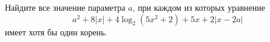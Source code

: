 \begin{ex}
	\begin{condition}
		Найдите все значение параметра \( a \), при каждом из которых уравнение \[ a^2+8|x|+4\log_2(5x^2+2)+5x+2|x-2a| \] имеет хотя бы один корень.
	\end{condition}
\end{ex}